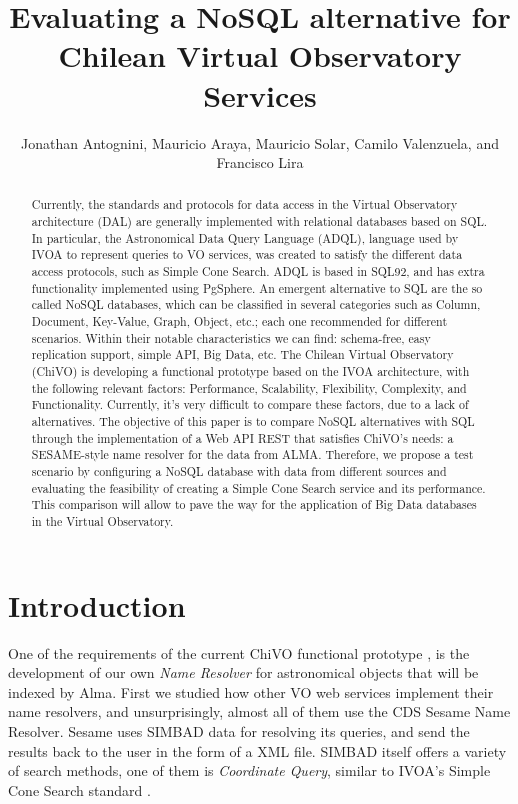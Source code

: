 \documentclass[11pt,twoside]{article}
\begin{document}
\title{Evaluating a NoSQL alternative for Chilean Virtual Observatory Services}
\author{Jonathan Antognini,  Mauricio Araya, Mauricio Solar, Camilo Valenzuela, and  Francisco Lira
}

\begin{abstract}
Currently, the standards and protocols for data access in the Virtual Observatory architecture (DAL) are generally implemented with
relational databases based on SQL. In particular, the Astronomical Data Query Language (ADQL), language used by IVOA to represent 
queries to VO services, was created to satisfy the different data access protocols, such as Simple Cone Search. ADQL is based in 
SQL92, and has extra functionality implemented using PgSphere. An emergent alternative to SQL are the so called NoSQL databases, 
which can be classified in several categories such as Column, Document, Key-Value, Graph, Object, etc.; each one recommended for 
different scenarios. Within their notable characteristics we can find: schema-free, easy replication support, simple API, Big Data,
etc. The Chilean Virtual Observatory (ChiVO) is developing a functional prototype based on the IVOA architecture, with the following
relevant factors: Performance, Scalability, Flexibility, Complexity, and Functionality. Currently, it's very difficult to compare 
these factors, due to a lack of alternatives. The objective of this paper is to compare NoSQL alternatives with SQL through the 
implementation of a Web API REST that satisfies ChiVO's needs: a SESAME-style name resolver for the data from ALMA. Therefore, 
we propose a test scenario by configuring a NoSQL database with data from different sources and evaluating the feasibility of 
creating a Simple Cone Search service and its performance. This comparison will allow to pave the way for the application of 
Big Data databases in the Virtual Observatory.
\end{abstract}

\section{Introduction}
One of the requirements of the current ChiVO functional prototype
, is the development of our own \emph{Name Resolver}
for astronomical objects that will be indexed by Alma. 
First we studied how other VO web services implement their name 
resolvers, and unsurprisingly, almost all of them use the CDS Sesame Name
Resolver. %
Sesame uses SIMBAD data for resolving its queries, and send the results
back to the user in the form of a XML file.
SIMBAD itself offers a variety of search methods, one of them is
\emph{Coordinate Query}, similar to IVOA’s Simple Cone Search standard \cite{williams2006ivoa}.
\end{document}
